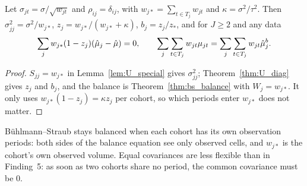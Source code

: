 \begin{theorem}\label{thm:U_balance}
  \leanok
  Let $\sigma_{jt} = \sigma/\sqrt{w_{jt}}$ and $\rho_{ij} = \delta_{ij}$, with
  $w_{j*} = \sum_{t\in T_j} w_{jt}$ and $\kappa = \sigma^2/\tau^2$. Then
  $\sigma^2_{jj} = \sigma^2/w_{j*}$, $z_j = w_{j*}/(w_{j*}+\kappa)$,
  $b_j = z_j/z_*$, and for $J \ge 2$ and any data
  \[
    \sum_j w_{j*}(1 - z_j)(\hat\mu_j - \hat\mu) = 0,\qquad
    \sum_j\sum_{t\in T_j} w_{jt}\mu_{jt} = \sum_j\sum_{t\in T_j} w_{jt}\hat\mu_j^b .
  \]
\end{theorem}
\begin{proof}
  \leanok
  $S_{jj} = w_{j*}$ in Lemma~\ref{lem:U_special} gives $\sigma^2_{jj}$;
  Theorem~\ref{thm:U_diag} gives $z_j$ and $b_j$, and the balance is
  Theorem~\ref{thm:bs_balance} with $W_j = w_{j*}$. It only uses
  $w_{j*}(1-z_j) = \kappa z_j$ per cohort, so which periods enter
  $w_{j*}$ does not matter.
\end{proof}

\begin{remark}\label{rem:unequal_balance}
  Bühlmann--Straub stays balanced when each cohort has its own observation
  periods: both sides of the balance equation see only observed cells, and
  $w_{j*}$ is the cohort's own observed volume. Equal covariances are less
  flexible than in Finding~5: as soon as two cohorts share no period, the
  common covariance must be $0$.
\end{remark}

